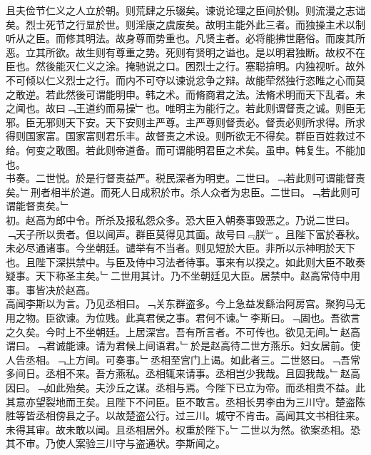 \documentclass{zhvt-classic}
\begin{document}
\hspace*{2em}且夫俭节仁义之人立於朝。则荒肆之乐辍矣。谏说论理之臣间於侧。则流漫之志诎矣。烈士死节之行显於世。则淫康之虞废矣。故明主能外此三者。而独操主术以制听从之臣。而修其明法。故身尊而势重也。凡贤主者。必将能拂世磨俗。而废其所恶。立其所欲。故生则有尊重之势。死则有贤明之谥也。是以明君独断。故权不在臣也。然後能灭仁义之涂。掩驰说之口。困烈士之行。塞聪揜明。内独视听。故外不可倾以仁义烈士之行。而内不可夺以谏说忿争之辩。故能荦然独行恣睢之心而莫之敢逆。若此然後可谓能明申。韩之术。而脩商君之法。法脩术明而天下乱者。未之闻也。故曰﹁王道约而易操﹂也。唯明主为能行之。若此则谓督责之诚。则臣无邪。臣无邪则天下安。天下安则主严尊。主严尊则督责必。督责必则所求得。所求得则国家富。国家富则君乐丰。故督责之术设。则所欲无不得矣。群臣百姓救过不给。何变之敢图。若此则帝道备。而可谓能明君臣之术矣。虽申。韩复生。不能加也。\\
\hspace*{2em}书奏。二世悦。於是行督责益严。税民深者为明吏。二世曰。﹁若此则可谓能督责矣。﹂刑者相半於道。而死人日成积於市。杀人众者为忠臣。二世曰。﹁若此则可谓能督责矣。﹂\\
\hspace*{2em}初。赵高为郎中令。所杀及报私怨众多。恐大臣入朝奏事毁恶之。乃说二世曰。﹁天子所以贵者。但以闻声。群臣莫得见其面。故号曰﹃朕﹄。且陛下富於春秋。未必尽通诸事。今坐朝廷。谴举有不当者。则见短於大臣。非所以示神明於天下也。且陛下深拱禁中。与臣及侍中习法者待事。事来有以揆之。如此则大臣不敢奏疑事。天下称圣主矣。﹂二世用其计。乃不坐朝廷见大臣。居禁中。赵高常侍中用事。事皆决於赵高。\\
\hspace*{2em}高闻李斯以为言。乃见丞相曰。﹁关东群盗多。今上急益发繇治阿房宫。聚狗马无用之物。臣欲谏。为位贱。此真君侯之事。君何不谏。﹂李斯曰。﹁固也。吾欲言之久矣。今时上不坐朝廷。上居深宫。吾有所言者。不可传也。欲见无间。﹂赵高谓曰。﹁君诚能谏。请为君候上间语君。﹂於是赵高待二世方燕乐。妇女居前。使人告丞相。﹁上方间。可奏事。﹂丞相至宫门上谒。如此者三。二世怒曰。﹁吾常多间日。丞相不来。吾方燕私。丞相辄来请事。丞相岂少我哉。且固我哉。﹂赵高因曰。﹁如此殆矣。夫沙丘之谋。丞相与焉。今陛下已立为帝。而丞相贵不益。此其意亦望裂地而王矣。且陛下不问臣。臣不敢言。丞相长男李由为三川守。楚盗陈胜等皆丞相傍县之子。以故楚盗公行。过三川。城守不肯击。高闻其文书相往来。未得其审。故未敢以闻。且丞相居外。权重於陛下。﹂二世以为然。欲案丞相。恐其不审。乃使人案验三川守与盗通状。李斯闻之。\\
\end{document}
